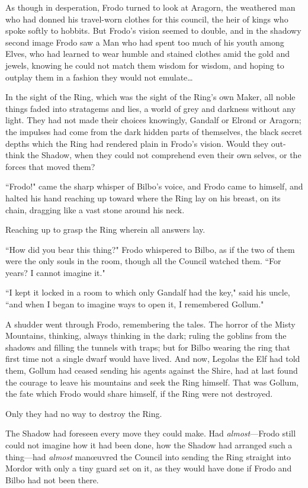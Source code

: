 As though in desperation, Frodo turned to look at Aragorn, the weathered man who had donned his travel-worn clothes for this council, the heir of kings who spoke softly to hobbits. But Frodo's vision seemed to double, and in the shadowy second image Frodo saw a Man who had spent too much of his youth among Elves, who had learned to wear humble and stained clothes amid the gold and jewels, knowing he could not match them wisdom for wisdom, and hoping to outplay them in a fashion they would not emulate{\ldots}

In the sight of the Ring, which was the sight of the Ring's own Maker, all noble things faded into stratagems and lies, a world of grey and darkness without any light. They had not made their choices knowingly, Gandalf or Elrond or Aragorn; the impulses had come from the dark hidden parts of themselves, the black secret depths which the Ring had rendered plain in Frodo's vision. Would they out-think the Shadow, when they could not comprehend even their own selves, or the forces that moved them?

``Frodo!" came the sharp whisper of Bilbo's voice, and Frodo came to himself, and halted his hand reaching up toward where the Ring lay on his breast, on its chain, dragging like a vast stone around his neck.

Reaching up to grasp the Ring wherein all answers lay.

``How did you bear this thing?" Frodo whispered to Bilbo, as if the two of them were the only souls in the room, though all the Council watched them. ``For years? I cannot imagine it."

``I kept it locked in a room to which only Gandalf had the key," said his uncle, ``and when I began to imagine ways to open it, I remembered Gollum."

A shudder went through Frodo, remembering the tales. The horror of the Misty Mountains, thinking, always thinking in the dark; ruling the goblins from the shadows and filling the tunnels with traps; but for Bilbo wearing the ring that first time not a single dwarf would have lived. And now, Legolas the Elf had told them, Gollum had ceased sending his agents against the Shire, had at last found the courage to leave his mountains and seek the Ring himself. That was Gollum, the fate which Frodo would share himself, if the Ring were not destroyed.

Only they had no way to destroy the Ring.

The Shadow had foreseen every move they could make. Had \emph{almost}—Frodo still could not imagine how it had been done, how the Shadow had arranged such a thing—had \emph{almost} manœuvred the Council into sending the Ring straight into Mordor with only a tiny guard set on it, as they would have done if Frodo and Bilbo had not been there.

